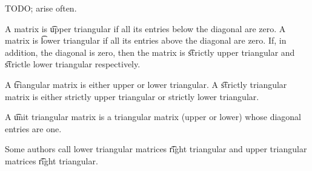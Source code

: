 

TODO;
arise often.


A matrix is \t{upper triangular} if all its entries below the diagonal are zero.
A matrix is \t{lower triangular} if all its entries above the diagonal are zero.
If, in addition, the diagonal is zero, then the matrix is \t{strictly upper triangular} and \t{strictle lower triangular} respectively.

A \t{triangular} matrix is either upper or lower triangular.
A \t{strictly triangular} matrix is either strictly upper triangular or strictly lower triangular.

A \t{unit triangular matrix} is a triangular matrix (upper or lower) whose diagonal entries are one.


Some authors call lower triangular matrices \t{right triangular} and upper triangular matrices \t{right triangular}.
